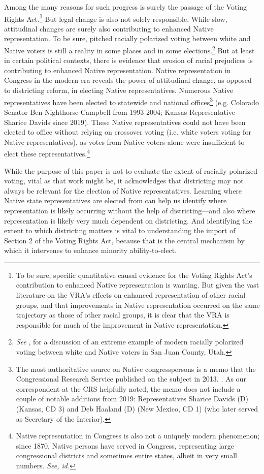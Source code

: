 \documentclass[12pt]{article}
\begin{document}
Among the many reasons for such progress is surely the passage of the Voting Rights Act.\footnote{To be sure, specific quantitative causal evidence for the Voting Rights Act's contribution to enhanced Native representation is wanting. But given the vast literature on the VRA's effects on enhanced representation of other racial groups, and that improvements in Native representation occurred on the same trajectory as those of other racial groups, it is clear that the VRA is responsible for much of the improvement in Native representation.} But legal change is also not solely responsible. While slow, attitudinal changes are surely also contributing to enhanced Native representation. To be sure, pitched racially polarized voting between white and Native voters is still a reality in some places and in some elections.\footnote{\textit{See} \cite{zhang2020native}, for a discussion of an extreme example of modern racially polarized voting between white and Native voters in San Juan County, Utah.} But at least in certain political contexts, there is evidence that erosion of racial prejudices is contributing to enhanced Native representation. Native representation in Congress in the modern era reveals the power of attitudinal change, as opposed to districting reform, in electing Native representatives. Numerous Native representatives have been elected to statewide and national offices\footnote{The most authoritative source on Native congresspersons is a memo that the Congressional Research Service published on the subject in 2013. \cite{crs2013members}. As our correspondent at the CRS helpfully noted, the memo does not include a couple of notable additions from 2019: Representatives Sharice Davids (D) (Kansas, CD 3) and Deb Haaland (D) (New Mexico, CD 1) (who later served as Secretary of the Interior).} (e.g. Colorado Senator Ben Nighthorse Campbell from 1993-2004; Kansas Representative Sharice Davids since 2019). These Native representatives could not have been elected to office without relying on crossover voting (i.e. white voters voting for Native representatives), as votes from Native voters alone were insufficient to elect these representatives.\footnote{Native representation in Congress is also not a uniquely modern phenomenon; since 1870, Native persons have served in Congress, representing large congressional districts and sometimes entire states, albeit in very small numbers. \textit{See, id.}}

While the purpose of this paper is not to evaluate the extent of racially polarized voting, vital as that work might be, it acknowledges that districting may not always be relevant for the election of Native representatives. Learning where Native state representatives are elected from can help us identify where representation is likely occurring without the help of districting—and also where representation is likely very much dependent on districting. And identifying the extent to which districting matters is vital to understanding the import of Section 2 of the Voting Rights Act, because that is the central mechanism by which it intervenes to enhance minority ability-to-elect.
\end{document}
